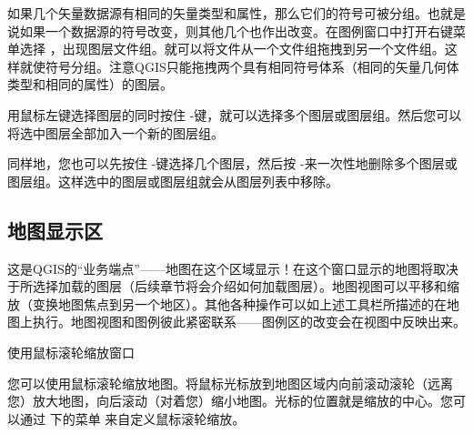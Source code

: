 如果几个矢量数据源有相同的矢量类型和属性，那么它们的符号可被分组。也就是说如果一个数据源的符号改变，则其他几个也作出改变。在图例窗口中打开右键菜单选择 ，出现图层文件组。就可以将文件从一个文件组拖拽到另一个文件组。这样就使符号分组。注意QGIS只能拖拽两个具有相同符号体系（相同的矢量几何体类型和相同的属性）的图层。

用鼠标左键选择图层的同时按住 -键，就可以选择多个图层或图层组。然后您可以将选中图层全部加入一个新的图层组。


同样地，您也可以先按住 -键选择几个图层，然后按 -来一次性地删除多个图层或图层组。这样选中的图层或图层组就会从图层列表中移除。

%

\subsection{地图显示区}\label{label_mapview}

这是QGIS的“业务端点”——地图在这个区域显示！在这个窗口显示的地图将取决于所选择加载的图层（后续章节将会介绍如何加载图层）。地图视图可以平移和缩放（变换地图焦点到另一个地区）。其他各种操作可以如上述工具栏所描述的在地图上执行。地图视图和图例彼此紧密联系——图例区的改变会在视图中反映出来。

\begin{Tip}\caption{\textsc{使用鼠标滚轮缩放窗口}}
您可以使用鼠标滚轮缩放地图。将鼠标光标放到地图区域内向前滚动滚轮（远离您）放大地图，向后滚动（对着您）缩小地图。光标的位置就是缩放的中心。您可以通过  \arrow {} 下的菜单  来自定义鼠标滚轮缩放。
\end{Tip}

